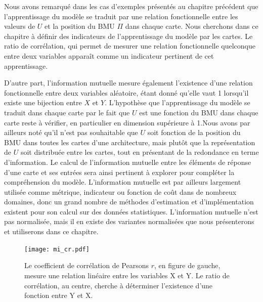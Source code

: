 \documentclass[../main]{subfiles}
\begin{document}
Nous avons remarqué dans les cas d'exemples présentés au chapitre précédent que l'apprentissage du modèle se traduit par une relation fonctionnelle entre les valeurs de $U$ et la position du BMU $\Pi$ dans chaque carte. 
Nous cherchons dans ce chapitre à définir des indicateurs de l'apprentissage du modèle par les cartes. Le ratio de corrélation, qui permet de mesurer une relation fonctionnelle quelconque entre deux variables apparaît comme un indicateur pertinent de cet apprentissage.

D'autre part, l'information mutuelle mesure également l'existence d'une relation fonctionnelle entre deux variables aléatoire, étant donné qu'elle vaut 1 lorsqu'il existe une bijection entre $X$ et $Y$.
L'hypothèse que l'apprentissage du modèle se traduit dans chaque carte par le fait que $U$ est une fonction du BMU dans chaque carte reste à vérifier, en particulier en dimension supérieure à 1.Nous avons par ailleurs noté qu'il n'est pas souhaitable que $U$ soit fonction de la position du BMU dans toutes les cartes d'une architecture, mais plutôt que la représentation de $U$ soit distribuée entre les cartes, tout en présentant de la redondance en terme d'information.
Le calcul de l'information mutuelle entre les éléments de réponse d'une carte et ses entrées sera ainsi pertinent à explorer pour compléter la compréhension du modèle. 
L'information mutuelle est par ailleurs largement utilisée comme métrique, indicateur ou fonction de coût dans de nombreux domaines, donc un grand nombre de méthodes d'estimation et d'implémentation existent pour son calcul sur des données statistiques.
L'information mutuelle n'est pas normalisée, mais il en existe des variantes normalisées que nous présenterons et utiliserons dans ce chapitre. 

\begin{figure}
    \texttt{[image: mi\_cr.pdf]}
    \caption{Le coefficient de corrélation de Pearsons $r$, en figure de gauche, mesure une relation linéaire entre les variables X et Y. Le ratio de corrélation, au centre, cherche à déterminer l'existence d'une fonction entre Y et X. \label{fig:signaux}}
\end{figure}

\end{document}
